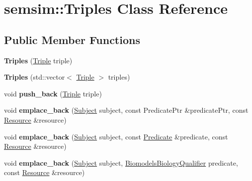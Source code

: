 \hypertarget{classsemsim_1_1Triples}{}\section{semsim\+:\+:Triples Class Reference}
\label{classsemsim_1_1Triples}
\subsection*{Public Member Functions}
\begin{DoxyCompactItemize}
\item 
\mbox{\label{classsemsim_1_1Triples_a620eba7d105212f69f762e9614c82928}} 
{\bfseries Triples} (\hyperlink{classsemsim_1_1Triple}{Triple} triple)
\item 
\mbox{\label{classsemsim_1_1Triples_a09d81ba233bf8a3ca5a9ede2df74c825}} 
{\bfseries Triples} (std\+::vector$<$ \hyperlink{classsemsim_1_1Triple}{Triple} $>$ triples)
\item 
\mbox{\label{classsemsim_1_1Triples_a6a93d787c250b81592bb9b5fa30fdec2}} 
void {\bfseries push\+\_\+back} (\hyperlink{classsemsim_1_1Triple}{Triple} triple)
\item 
\mbox{\label{classsemsim_1_1Triples_a2387f43385258c96bd68ca38d1a53c94}} 
void {\bfseries emplace\+\_\+back} (\hyperlink{classsemsim_1_1Subject}{Subject} subject, const Predicate\+Ptr \&predicate\+Ptr, const \hyperlink{classsemsim_1_1Resource}{Resource} \&resource)
\item 
\mbox{\label{classsemsim_1_1Triples_a69c8a69a0dcffc60e510b731a0ffec69}} 
void {\bfseries emplace\+\_\+back} (\hyperlink{classsemsim_1_1Subject}{Subject} subject, const \hyperlink{classsemsim_1_1Predicate}{Predicate} \&predicate, const \hyperlink{classsemsim_1_1Resource}{Resource} \&resource)
\item 
\mbox{\label{classsemsim_1_1Triples_a139321c0554ce0cf98d2fccc82599653}} 
void {\bfseries emplace\+\_\+back} (\hyperlink{classsemsim_1_1Subject}{Subject} subject, \hyperlink{classsemsim_1_1BiomodelsBiologyQualifier}{Biomodels\+Biology\+Qualifier} predicate, const \hyperlink{classsemsim_1_1Resource}{Resource} \&resource)

\end{DoxyCompactItemize}
